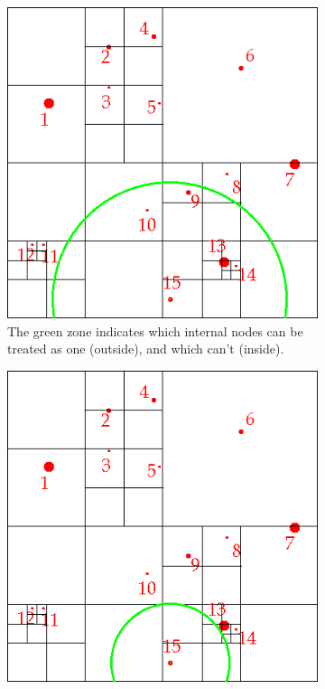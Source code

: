 \begin{figure}[ht]
\begin{subfigure}{0.24\textwidth}
\includegraphics[width=\textwidth]{barneshut_map_green_3.png}
\caption{The green zone indicates which internal nodes can be treated as one (outside), and which can't (inside).}
\end{subfigure}\hspace{1cm}
\begin{subfigure}{0.24\textwidth}
\includegraphics[width=\textwidth]{barneshut_map_green_4.png}

\end{subfigure}
\end{figure}
